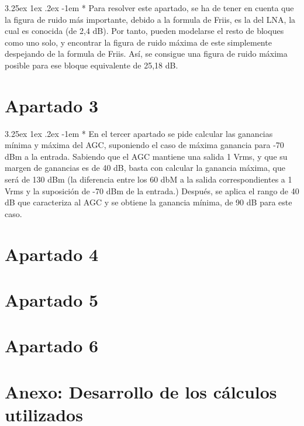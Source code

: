 \documentclass[12pt]{article}
\makeatletter
\renewcommand\paragraph{\@startsection{paragraph}{5}{\z@}%
  {3.25ex \@plus1ex \@minus.2ex}%
  {-1em}%
  {\normalfont\normalsize\bfseries}}
\makeatother
\begin{document}
  \paragraph*{}
  Para resolver este apartado, se ha de tener en cuenta que la figura de ruido más importante, debido a la formula de Friis, es la del LNA, la cual es conocida (de 2,4 dB).
  Por tanto, pueden modelarse el resto de bloques como uno solo, y encontrar la figura de ruido máxima de este simplemente despejando de la formula de Friis. Así,
  se consigue una figura de ruido máxima posible para ese bloque equivalente de 25,18 dB.

  \section{Apartado 3}
  \paragraph*{}
  En el tercer apartado se pide calcular las ganancias mínima y máxima del AGC, suponiendo el caso de máxima ganancia para -70 dBm a la entrada.
  Sabiendo que el AGC mantiene una salida 1 Vrms, y que su margen de ganancias es de 40 dB, basta con calcular la ganancia máxima, que será de 130 dBm
  (la diferencia entre los 60 dbM a la salida correspondientes a 1 Vrms y la suposición de -70 dBm de la entrada.) Después, se aplica el rango de 40 dB que
  caracteriza al AGC y se obtiene la ganancia mínima, de 90 dB para este caso.
  \section{Apartado 4}

  \section{Apartado 5}
    
  \section{Apartado 6}

  \section{Anexo: Desarrollo de los cálculos utilizados}

  
  
 
\end{document}
